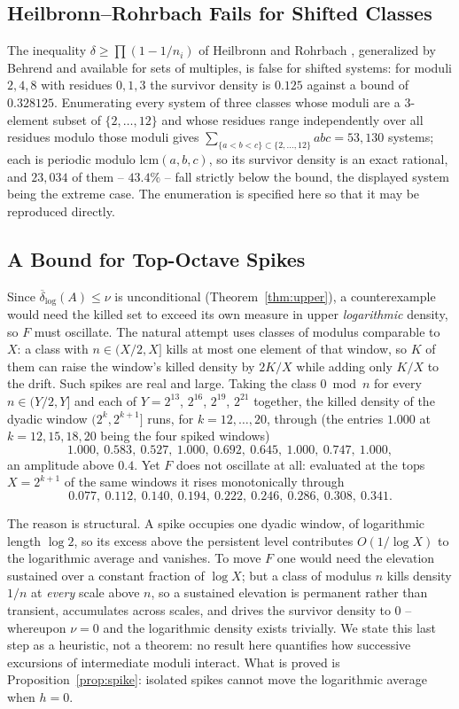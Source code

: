 \documentclass[11pt]{article}
\theoremstyle{plain}
\theoremstyle{definition}
\begin{document}
\subsection*{Heilbronn--Rohrbach Fails for Shifted Classes}
The inequality $\delta\ge\prod(1-1/n_i)$ of Heilbronn and
Rohrbach \cite{Heilbronn,Rohrbach}, generalized by Behrend
\cite{Behrend} and available for sets of multiples, is false for
shifted systems: for moduli $2,4,8$ with
residues $0,1,3$ the survivor density is $0.125$ against a bound
of $0.328125$.  Enumerating every system of three classes whose
moduli are a $3$-element subset of $\{2,\dots,12\}$ and whose
residues range independently over all residues modulo those
moduli gives
$\sum_{\{a<b<c\}\subset\{2,\dots,12\}}abc=53{,}130$ systems;
each is periodic modulo $\mathrm{lcm}(a,b,c)$, so its survivor
density is an exact rational, and $23{,}034$ of them --
$43.4\%$ -- fall strictly below the bound, the displayed system
being the extreme case.  The enumeration is specified here so
that it may be reproduced directly.

\subsection*{A Bound for Top-Octave Spikes}
Since $\overline{\delta}_{\log}(A)\le\nu$ is unconditional
(Theorem~\ref{thm:upper}), a counterexample would need the
killed set to exceed its own measure in upper \emph{logarithmic}
density, so $F$ must oscillate.  The natural attempt uses
classes of modulus comparable to $X$: a class with
$n\in(X/2,X]$ kills at most one element of that window, so $K$
of them can raise the window's killed density by $2K/X$ while
adding only $K/X$ to the drift.  Such spikes are real and large.
Taking the class $0\bmod n$ for every $n\in(Y/2,Y]$ and each
of $Y=2^{13}$, $2^{16}$, $2^{19}$, $2^{21}$ together, the killed
density of the dyadic window $(2^k,2^{k+1}]$ runs, for
$k=12,\dots,20$, through (the entries $1.000$ at $k=12,15,18,20$
being the four spiked windows)
\[
  1.000,\ 0.583,\ 0.527,\ 1.000,\ 0.692,\ 0.645,\ 1.000,
  \ 0.747,\ 1.000,
\]
an amplitude above $0.4$.  Yet $F$ does not oscillate at all:
evaluated at the tops $X=2^{k+1}$ of the same windows it rises
monotonically through
\[
0.077,\ 0.112,\ 0.140,\ 0.194,\ 0.222,\ 0.246,\ 0.286,\ 0.308,\ 0.341.
\]

The reason is structural.  A spike occupies one dyadic window,
of logarithmic length $\log 2$, so its excess above the
persistent level contributes $O(1/\log X)$ to the logarithmic
average and vanishes.  To move $F$ one would need the elevation
sustained over a constant fraction of $\log X$; but a class of
modulus $n$ kills density $1/n$ at \emph{every} scale above
$n$, so a sustained elevation is permanent rather than
transient, accumulates across scales, and drives the survivor
density to $0$ -- whereupon $\nu=0$ and the logarithmic density
exists trivially.  We state this last step as a heuristic, not a
theorem: no result here quantifies how successive excursions of
intermediate moduli interact.  What is proved is
Proposition~\ref{prop:spike}: isolated spikes cannot move the
logarithmic average when $h=0$.
\end{document}
